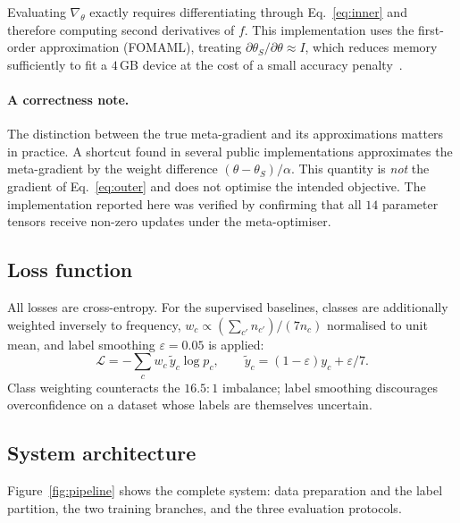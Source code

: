 \documentclass[11pt,a4paper]{article}
\begin{document}
Evaluating $\nabla_\theta$ exactly requires differentiating through
Eq.~\ref{eq:inner} and therefore computing second derivatives of $f$. This
implementation uses the first-order approximation (FOMAML), treating
$\partial \theta_S / \partial \theta \approx I$, which reduces memory
sufficiently to fit a $4$\,GB device at the cost of a small accuracy
penalty~\cite{finn2017model,nichol2018first}.

\paragraph{A correctness note.}
The distinction between the true meta-gradient and its approximations matters
in practice. A shortcut found in several public implementations approximates
the meta-gradient by the weight difference $(\theta - \theta_S)/\alpha$. This
quantity is \emph{not} the gradient of Eq.~\ref{eq:outer} and does not optimise
the intended objective. The implementation reported here was verified by
confirming that all $14$ parameter tensors receive non-zero updates under the
meta-optimiser.

\subsection{Loss function}
All losses are cross-entropy. For the supervised baselines, classes are
additionally weighted inversely to frequency,
$w_c \propto \left( \sum_{c'} n_{c'} \right) / (7 n_c)$ normalised to unit
mean, and label smoothing $\varepsilon = 0.05$ is applied:
\begin{equation}
\mathcal{L} = -\sum_{c} w_c \, \tilde{y}_c \log p_c, \qquad
\tilde{y}_c = (1-\varepsilon) y_c + \varepsilon/7 .
\label{eq:loss}
\end{equation}
Class weighting counteracts the $16.5{:}1$ imbalance; label smoothing
discourages overconfidence on a dataset whose labels are themselves uncertain.

\subsection{System architecture}
Figure~\ref{fig:pipeline} shows the complete system: data preparation and the
label partition, the two training branches, and the three evaluation
protocols.
\end{document}
